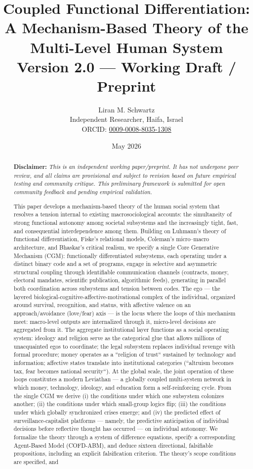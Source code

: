 \documentclass[12pt,a4paper]{article}
\title{Coupled Functional Differentiation:\\
A Mechanism-Based Theory of the Multi-Level Human System\\[1em]
\large Version 2.0 --- Working Draft / Preprint}
\author{Liran M. Schwartz\\
\small Independent Researcher, Haifa, Israel\\
\small ORCID: \href{https://orcid.org/0009-0008-8035-1308}{0009-0008-8035-1308}}
\date{May 2026}
\begin{document}
\maketitle

\begin{abstract}
\noindent\textbf{Disclaimer:} \textit{This is an independent working paper/preprint. It has not undergone peer review, and all claims are provisional and subject to revision based on future empirical testing and community critique. This preliminary framework is submitted for open community feedback and pending empirical validation.}

\bigskip

This paper develops a mechanism-based theory of the human social system that resolves a tension internal to existing macrosociological accounts: the simultaneity of strong functional autonomy among societal subsystems and the increasingly tight, fast, and consequential interdependence among them. Building on Luhmann's theory of functional differentiation, Fiske's relational models, Coleman's micro--macro architecture, and Bhaskar's critical realism, we specify a single Core Generative Mechanism (CGM): functionally differentiated subsystems, each operating under a distinct binary code and a set of programs, engage in selective and asymmetric structural coupling through identifiable communication channels (contracts, money, electoral mandates, scientific publication, algorithmic feeds), generating in parallel both coordination across subsystems and tension between codes. The ego --- the layered biological-cognitive-affective-motivational complex of the individual, organized around survival, recognition, and status, with affective valence on an approach/avoidance (love/fear) axis --- is the locus where the loops of this mechanism meet: macro-level outputs are internalized through it, micro-level decisions are aggregated from it. The aggregate institutional layer functions as a social operating system: ideology and religion serve as the categorical glue that allows millions of unacquainted egos to coordinate; the legal subsystem replaces individual revenge with formal procedure; money operates as a ``religion of trust`` sustained by technology and information; affective states translate into institutional categories (``altruism becomes tax, fear becomes national security``). At the global scale, the joint operation of these loops constitutes a modern Leviathan --- a globally coupled multi-system network in which money, technology, ideology, and education form a self-reinforcing cycle. From the single CGM we derive (i) the conditions under which one subsystem colonizes another; (ii) the conditions under which small-group logics flip; (iii) the conditions under which globally synchronized crises emerge; and (iv) the predicted effect of surveillance-capitalist platforms --- namely, the predictive anticipation of individual decisions before reflective thought has occurred --- on individual autonomy. We formalize the theory through a system of difference equations, specify a corresponding Agent-Based Model (COFD-ABM), and deduce sixteen directional, falsifiable propositions, including an explicit falsification criterion. The theory's scope conditions are specified, and 
\end{abstract}
\end{document}
